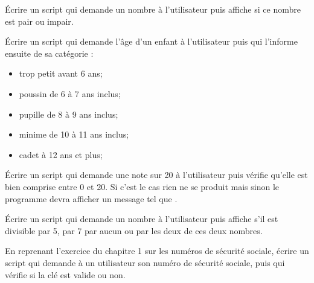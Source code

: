 \begin{exercice}[]
	\'Ecrire un script qui demande un nombre à l'utilisateur puis affiche si ce nombre est pair ou impair.
\end{exercice}
\begin{exercice}
	\'Ecrire un script qui demande l'âge d'un enfant à l'utilisateur puis qui l'informe ensuite de sa catégorie :
	\begin{itemize}
		\item   trop petit avant 6 ans;
		\item   poussin de 6 à 7 ans inclus;
		\item   pupille de 8 à 9 ans inclus;
		\item   minime de 10 à 11 ans inclus;
		\item   cadet à 12 ans et plus;
	\end{itemize}
\end{exercice}

\begin{exercice}
	\'Ecrire un script qui demande une note sur 20 à l'utilisateur puis vérifie qu'elle est bien comprise entre 0 et 20. Si c'est le cas rien ne se produit mais sinon le programme devra afficher un message tel que .
\end{exercice}

\begin{exercice}
	\'Ecrire un script qui demande un nombre à l'utilisateur puis affiche s'il est divisible par 5, par 7 par aucun ou par les deux de ces deux nombres.
\end{exercice}
\begin{exercice}
	En reprenant l'exercice du chapitre 1 sur les numéros de sécurité sociale, écrire un script qui demande à un utilisateur son numéro de sécurité sociale, puis qui vérifie si la clé est valide ou non.
\end{exercice}


